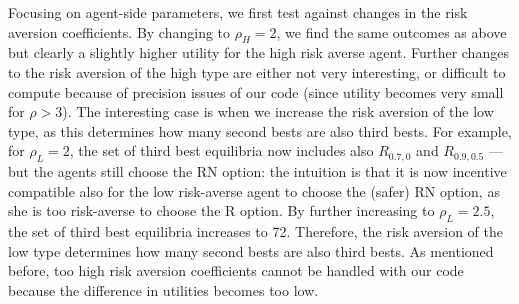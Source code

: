 Focusing on agent-side parameters, we first test against changes in the risk aversion coefficients. By changing to $\rho_H = 2$, we find the same outcomes as above but clearly a slightly higher utility for the high risk averse agent. Further changes to the risk aversion of the high type are either not very interesting, or difficult to compute because of precision issues of our code (since utility becomes very small for $\rho > 3$). The interesting case is when we increase the risk aversion of the low type, as this determines how many second bests are also third bests. For example, for $\rho_L=2$, the set of third best equilibria now includes also $R_{0.7,0}$ and $R_{0.9,0.5}$ --- but the agents still choose the RN option: the intuition is that it is now incentive compatible also for the low risk-averse agent to choose the (safer) RN option, as she is too risk-averse to choose the R option. By further increasing to $\rho_L=2.5$, the set of third best equilibria increases to 72. Therefore, the risk aversion of the low type determines how many second bests are also third bests. As mentioned before, too high risk aversion coefficients cannot be handled with our code because the difference in utilities becomes too low.
